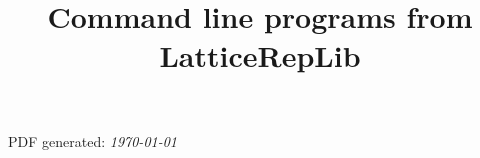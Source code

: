 \documentclass[preprint]{iucr}              %
\numberwithin{equation}{section}
\begin{document}
	\singlespacing

	
	
	
	
	
	
	
	
	
	
	
	{\Large PDF generated: \emph{\today}} \\
	\title{Command line programs from LatticeRepLib}
	
	
\end{document}
